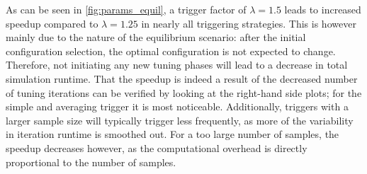 As can be seen in \autoref{fig:params_equil}, a trigger factor of $\lambda=1.5$ leads to increased speedup compared to $\lambda=1.25$ in nearly all triggering strategies. This is however mainly due to the nature of the equilibrium scenario: after the initial configuration selection, the optimal configuration is not expected to change.
Therefore, not initiating any new tuning phases will lead to a decrease in total simulation runtime. That the speedup is indeed  a result of the decreased number of tuning iterations can be verified by looking at the right-hand side plots; for the simple and averaging trigger it is most noticeable.
Additionally, triggers with a larger sample size will typically trigger less frequently, as more of the variability in iteration runtime is smoothed out. For a too large number of samples, the speedup decreases however, as the computational overhead is directly proportional to the number of samples.


